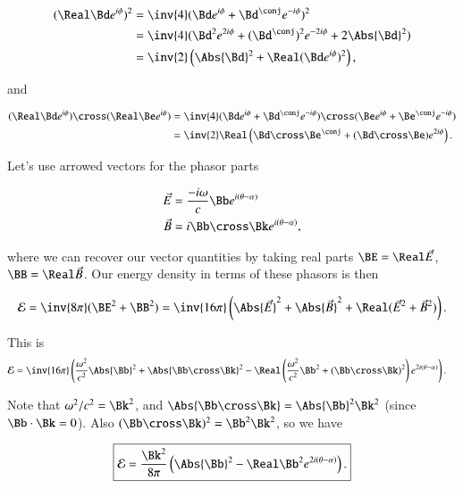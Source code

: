 \begin{align*}
(\Real \Bd e^{i\phi})^2 
&= \inv{4} ( \Bd e^{i\phi} + \Bd^\conj e^{-i\phi})^2 \\
&= \inv{4} ( \Bd^2 e^{2 i \phi} + (\Bd^\conj)^2 e^{-2 i \phi} + 2 \Abs{\Bd}^2 ) \\
&= \inv{2} \left( \Abs{\Bd}^2 + \Real ( \Bd e^{i \phi} )^2 \right),
\end{align*}

and

\begin{align*}
(\Real \Bd e^{i\phi}) \cross (\Real \Be e^{i\phi}) 
&= \inv{4} 
( \Bd e^{i\phi} + \Bd^\conj e^{-i\phi}) \cross ( \Be e^{i\phi} + \Be^\conj e^{-i\phi}) \\
&= \inv{2} \Real \left( \Bd \cross \Be^\conj + (\Bd \cross \Be) e^{2 i \phi} \right).
\end{align*}

Let's use arrowed vectors for the phasor parts

\begin{align}\label{eqn:relElectroDynProblemSet4:250}
\vec{E} &= \frac{-i\omega}{c} \Bb e^{i(\theta - \alpha)} \\
\vec{B} &= i \Bb \cross \Bk e^{i(\theta - \alpha)},
\end{align}

where we can recover our vector quantities by taking real parts $\BE = \Real \vec{E}$, $\BB = \Real \vec{B}$.  Our energy density in terms of these phasors is then

\begin{equation}\label{eqn:relElectroDynProblemSet4:270}
\mathcal{E} 
= \inv{8\pi} (\BE^2 + \BB^2)
= \inv{16\pi} \left( \Abs{\vec{E}}^2 + \Abs{\vec{B}}^2 + \Real ({\vec{E}}^2 + {\vec{B}}^2) \right).
\end{equation}

This is
\begin{align*}
\mathcal{E} 
&=
\inv{16\pi}
\left(
\frac{\omega^2}{c^2} \Abs{\Bb}^2 + \Abs{\Bb \cross \Bk}^2
-\Real \left(
\frac{\omega^2}{c^2} \Bb^2 + (\Bb \cross \Bk)^2
\right)
e^{2 i(\theta - \alpha)} 
\right).
\end{align*}

Note that $\omega^2/c^2 = \Bk^2$, and $\Abs{\Bb \cross \Bk} = \Abs{\Bb}^2 \Bk^2$ (since $\Bb \cdot \Bk = 0$).  Also $(\Bb \cross \Bk)^2 = \Bb^2 \Bk^2$, so we have

\begin{equation}\label{eqn:relElectroDynProblemSet4:290}
\boxed{
\mathcal{E} 
=
\frac{ \Bk^2 }{8\pi}
\left(
\Abs{\Bb}^2 
-\Real \Bb^2 e^{2 i(\theta - \alpha)} 
\right).
}
\end{equation}

